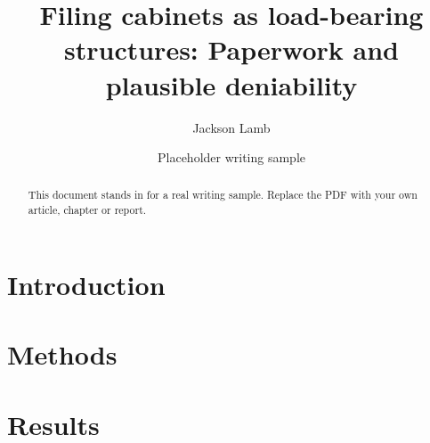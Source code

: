 \documentclass[11pt]{article}
\title{Filing cabinets as load-bearing structures: Paperwork and plausible deniability}
\author{Jackson Lamb}
\date{Placeholder writing sample}
\begin{document}
\maketitle
\begin{abstract}
This document stands in for a real writing sample. Replace the PDF with your own article, chapter or report.
\end{abstract}
\section{Introduction}
\lipsum[1-4]
\section{Methods}
\lipsum[5-9]
\section{Results}
\lipsum[10-14]
\end{document}

